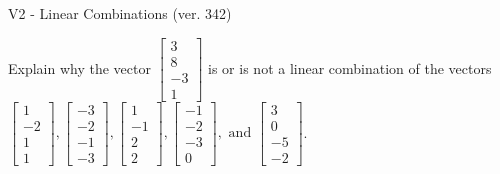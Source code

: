 \begin{exercise}
  \begin{exerciseTitle}V2 - Linear Combinations (ver. 342)\end{exerciseTitle}
  \begin{exerciseStatement}
    Explain why the vector \(\left[\begin{array}{c}
3 \\
8 \\
-3 \\
1
\end{array}\right]\)  is or is not a linear 
	combination of the vectors \(\left[\begin{array}{c}
1 \\
-2 \\
1 \\
1
\end{array}\right] , \left[\begin{array}{c}
-3 \\
-2 \\
-1 \\
-3
\end{array}\right] , \left[\begin{array}{c}
1 \\
-1 \\
2 \\
2
\end{array}\right] , \left[\begin{array}{c}
-1 \\
-2 \\
-3 \\
0
\end{array}\right] , \text{ and } \left[\begin{array}{c}
3 \\
0 \\
-5 \\
-2
\end{array}\right]\).
	



\end{exerciseStatement}
\end{exercise}
